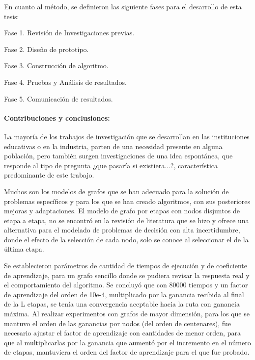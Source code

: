 {En cuanto al método, se definieron las siguiente fases para el desarrollo de esta tesis:

Fase 1. Revisión de Investigaciones previas.

Fase 2.  Diseño de prototipo.

Fase 3. Construcción de algoritmo. 

Fase 4. Pruebas y Análisis de resultados.

Fase 5. Comunicación de resultados.

\paragraph{Contribuciones y conclusiones:}
La mayoría de los trabajos de investigación que se desarrollan en las instituciones educativas o en la industria, parten de una necesidad presente en alguna población, pero también surgen investigaciones de una idea espontánea, que responde al tipo de pregunta ¿que pasaría si existiera...?, característica predominante de este trabajo. 

Muchos son los modelos de grafos que se han adecuado para la solución de problemas específicos y para los que se han creado algoritmos, con sus posteriores mejoras y adaptaciones. El modelo de grafo por etapas con nodos disjuntos de etapa a  etapa, no se encontró en la revisión de literatura que se hizo y ofrece una alternativa para el modelado de problemas de decisión con alta incertidumbre, donde el efecto de la selección de cada nodo, solo se conoce al seleccionar el de la última etapa.

Se establecieron parámetros de cantidad de tiempos de ejecución y de coeficiente de aprendizaje, para un grafo sencillo donde se pudiera revisar la respuesta real y el comportamiento del algoritmo. Se concluyó que con 80000 tiempos y un factor de aprendizaje del orden de 10e-4, multiplicado por la ganancia recibida al final de la L etapas, se tenía una convergencia aceptable hacia la ruta con ganancia máxima. Al realizar experimentos con grafos de mayor dimensión, para los que se mantuvo el orden de las ganancias por nodos (del orden de centenares), fue necesario ajustar el factor de aprendizaje con cantidades de menor orden, para que al multiplicarlas por la ganancia que aumentó por el incremento en el número de etapas, mantuviera el orden del factor de aprendizaje para el que fue probado.

}
